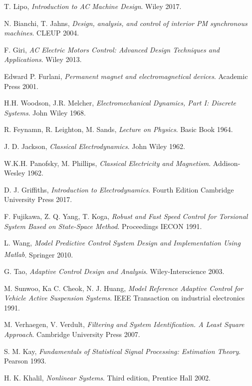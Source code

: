 \documentclass[11pt,a4paper,oneside]{book}
\numberwithin{equation}{section}
\theoremstyle{it}
\theoremstyle{definition}
\begin{document}
\begin{thebibliography}{99}
	T. Lipo,  \emph{Introduction to AC Machine Design}. Wiley 2017.
	
	N. Bianchi, T. Jahns,  \emph{Design, analysis, and control of interior PM synchronous machines}. CLEUP 2004.
	
	F. Giri, \emph{AC Electric Motors Control: Advanced Design Techniques and Applications}. Wiley 2013.

	Edward P. Furlani, \emph{Permanent magnet and electromagnetical devices}. Academic Press 
	2001.

	H.H. Woodson, J.R. Melcher, \emph{Electromechanical Dynamics, Part I: Discrete Systems}. John Wiley 1968.

	R. Feynamn, R. Leighton, M. Sands, \emph{Lecture on Physics}. Basic Book 1964.

	J. D. Jackson, \emph{Classical Electrodynamics}. John Wiley 1962.

	W.K.H. Panofsky, M. Phillips, \emph{Classical Electricity and Magnetism}. Addison-Wesley 1962.

	D. J. Griffiths, \emph{Introduction to Electrodynamics}. Fourth Edition Cambridge University Press 2017.

	F. Fujikawa, Z. Q. Yang, T. Koga, \emph{Robust and Fast Speed Control for Torsional System Based on State-Space Method}. Proceedings IECON 1991.

	L. Wang, \emph{Model Predictive Control System Design and Implementation Using 	Matlab\textsuperscript{\textregistered}}. Springer 2010.

	G. Tao, \emph{Adaptive Control Design and Analysis}. Wiley-Interscience 2003.
	
	M. Sunwoo, Ka C. Cheok, N. J. Huang,  \emph{Model Reference Adaptive Control for Vehicle Active Suspension Systems}. IEEE Transaction on industrial electronics 1991.
	
	M. Verhaegen, V. Verdult,  \emph{Filtering and System Identification. A Least Square Approach}. Cambridge University Press 2007.
	
	S. M. Kay,  \emph{Fundamentals of Statistical Signal Processing: Estimation Theory}. Pearson 1993.

	H. K. Khalil,  \emph{Nonlinear Systems}. Third edition, Prentice Hall 2002.
	

\end{thebibliography}
\end{document}

